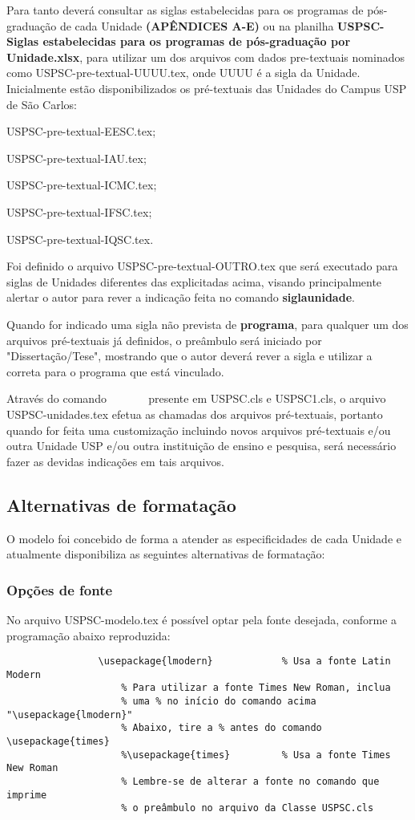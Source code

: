 			Para tanto deverá consultar as siglas estabelecidas para os programas de pós-graduação de cada Unidade \textbf{(APÊNDICES A-E)} ou na planilha \textbf{USPSC-Siglas estabelecidas para os programas de pós-graduação por Unidade.xlsx}, para utilizar um dos arquivos com dados pre-textuais nominados como USPSC-pre-textual-UUUU.tex, onde UUUU é a sigla da Unidade. Inicialmente estão disponibilizados os pré-textuais das Unidades do Campus USP de São Carlos:
			
\begin{alineas}	 
				\item USPSC-pre-textual-EESC.tex;
				\item USPSC-pre-textual-IAU.tex;
				\item USPSC-pre-textual-ICMC.tex;
				\item USPSC-pre-textual-IFSC.tex;
				\item USPSC-pre-textual-IQSC.tex.
\end{alineas}


Foi definido o arquivo USPSC-pre-textual-OUTRO.tex que será executado para siglas de Unidades diferentes das explicitadas acima, visando principalmente alertar o autor para rever a indicação feita no comando \textbf{siglaunidade}.

Quando for indicado uma sigla não prevista de \textbf{programa}, para qualquer um dos arquivos pré-textuais já definidos, o preâmbulo será iniciado por "Dissertação/Tese", mostrando que o autor deverá rever a sigla e utilizar a correta para o programa que está vinculado.

Através do comando \verb+      + presente em USPSC.cls e USPSC1.cls,  o arquivo USPSC-unidades.tex efetua as chamadas dos arquivos pré-textuais, portanto quando for feita uma customização incluindo novos arquivos pré-textuais e/ou outra Unidade USP e/ou outra instituição de ensino e pesquisa, será necessário fazer as devidas indicações em tais arquivos. 
	 
\subsection{Alternativas de formatação}
O modelo foi concebido de forma a atender as especificidades de cada Unidade e atualmente disponibiliza as seguintes alternativas de formatação:
\subsubsection{Opções de fonte} 
No arquivo USPSC-modelo.tex é possível optar pela fonte desejada, conforme a programação abaixo reproduzida:
				\begin{verbatim}
				\usepackage{lmodern}			% Usa a fonte Latin Modern
					% Para utilizar a fonte Times New Roman, inclua 
					% uma % no início do comando acima  "\usepackage{lmodern}"
					% Abaixo, tire a % antes do comando  \usepackage{times}
					%\usepackage{times}			% Usa a fonte Times New Roman
					% Lembre-se de alterar a fonte no comando que imprime 
					% o preâmbulo no arquivo da Classe USPSC.cls					
				\end{verbatim}

